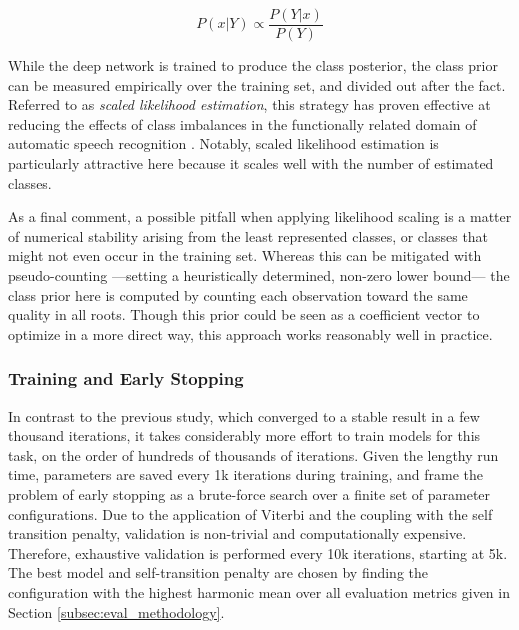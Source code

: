 \begin{equation}
P(x|Y) \varpropto \frac{P(Y|x)}{P(Y)}
\end{equation}

While the deep network is trained to produce the class posterior, the class prior can be measured empirically over the training set, and divided out after the fact.
Referred to as \emph{scaled likelihood estimation}, this strategy has proven effective at reducing the effects of class imbalances in the functionally related domain of automatic speech recognition \cite{Dahl2012Context}.
Notably, scaled likelihood estimation is particularly attractive here because it scales well with the number of estimated classes.

As a final comment, a possible pitfall when applying likelihood scaling is a matter of numerical stability arising from the least represented classes, or classes that might not even occur in the training set.
Whereas this can be mitigated with pseudo-counting ---setting a heuristically determined, non-zero lower bound--- the class prior here is computed by counting each observation toward the same quality in all roots.
Though this prior could be seen as a coefficient vector to optimize in a more direct way, this approach works reasonably well in practice.


\subsubsection{Training and Early Stopping}
\label{subsubsec:early_stopping}

In contrast to the previous study, which converged to a stable result in a few thousand iterations, it takes considerably more effort to train models for this task, on the order of hundreds of thousands of iterations.
Given the lengthy run time, parameters are saved every 1k iterations during training, and frame the problem of early stopping as a brute-force search over a finite set of parameter configurations.
Due to the application of Viterbi and the coupling with the self transition penalty, validation is non-trivial and computationally expensive.
Therefore, exhaustive validation is performed every 10k iterations, starting at 5k.
The best model and self-transition penalty are chosen by finding the configuration with the highest harmonic mean over all evaluation metrics given in Section \ref{subsec:eval_methodology}.



